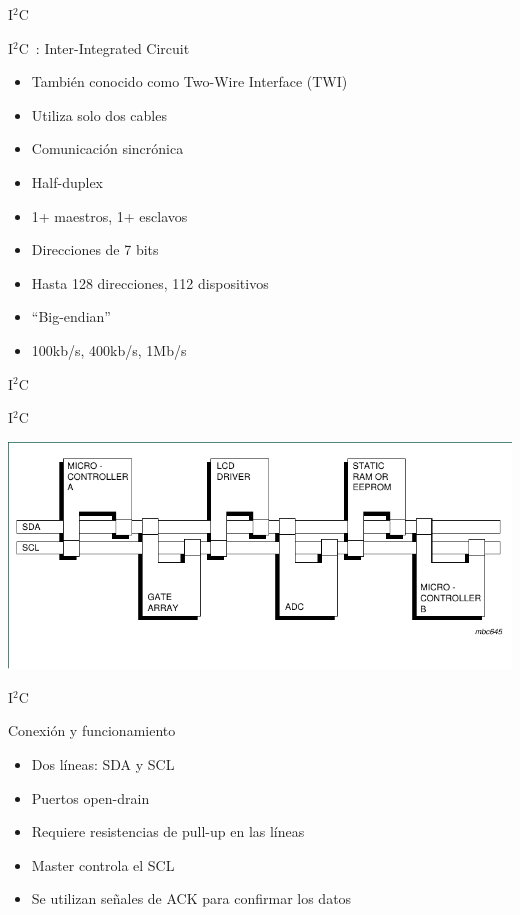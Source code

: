 \documentclass[xcolor=dvipsnames, handout]{beamer}
\newcommand{\iic}{I\ensuremath{^2}C\ }
\begin{document}
\begin{frame}{\iic}
  \begin{block}{\iic: Inter-Integrated Circuit}
    \begin{itemize}[<+->]
      \item También conocido como Two-Wire Interface (TWI)
      \item Utiliza solo dos cables
      \item Comunicación sincrónica
      \item Half-duplex
      \item 1+ maestros, 1+ esclavos
      \item Direcciones de 7 bits
      \item Hasta 128 direcciones, 112 dispositivos
      \item ``Big-endian''
      \item 100kb/s, 400kb/s, 1Mb/s
    \end{itemize}
  \end{block}
\end{frame}

\begin{frame}{\iic}
 \begin{block}{\iic}
  \begin{center}
   \includegraphics[width=\textwidth]{i2c-diag}
  \end{center}
 \end{block}
\end{frame}

\begin{frame}{\iic}
 \begin{block}{Conexión y funcionamiento}
  \begin{itemize}[<+->]
    \item Dos líneas: SDA y SCL
    \item Puertos open-drain
    \item Requiere resistencias de pull-up en las líneas
    \item Master controla el SCL
    \item Se utilizan señales de ACK para confirmar los datos
  \end{itemize}
 \end{block}

\end{frame}
\end{document}
